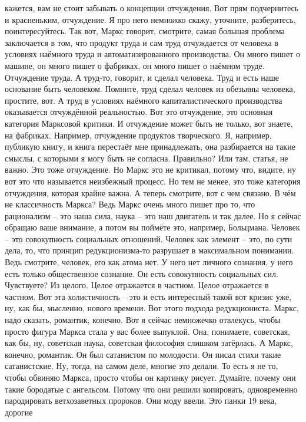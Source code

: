 кажется, вам не стоит забывать о концепции отчуждения. Вот прям подчернитесь и
красненьким, отчуждение. Я про него немножко скажу, уточните, разберитесь,
поинтересуйтесь. Так вот, Маркс говорит, смотрите, самая большая проблема
заключается в том, что продукт труда и сам труд отчуждается от человека в
условиях наёмного труда и автоматизированного производства. Он много пишет о
машине, он много пишет о фабриках, он много пишет о наёмном труде. Отчуждение
труда. А труд-то, говорит, и сделал человека. Труд и есть наше основание быть
человеком. Помните, труд сделал человек из обезьяны человека, простите, вот. А
труд в условиях наёмного капиталистического производства оказывается отчуждённой
реальностью. Вот это отчуждение, это основная категория Марксовой критики. И
отчуждение может быть не только, вот знаете, на фабриках. Например, отчуждение
продуктов творческого. Я, например, публикую книгу, и книга перестаёт мне
принадлежать, она разбирается на такие смыслы, с которыми я могу быть не
согласна. Правильно? Или там, статья, не важно. Это тоже отчуждение. Но Маркс
это не критикал, потому что, видите, ну вот это что называется неизбежный
процесс. Но тем не менее, это тоже категория отчуждения, которая крайне важна. А
теперь смотрите, вот с чем связано. В чём не классичность Маркса? Ведь Маркс
очень много пишет про то, что рационализм – это наша сила, наука – это наш
двигатель и так далее. Но я сейчас обращаю ваше внимание, а потом вы поймёте
это, например, Больцмана. Человек – это совокупность социальных отношений.
Человек как элемент – это, по сути дела, то, что принцип редукционизма-то
разрушает в максимальном понимании. Ведь смотрите, человек, его как атома нет. У
него нет личного сознания, у него есть только общественное сознание. Он есть
совокупность социальных сил. Чувствуете? Из целого. Целое отражается в частном.
Целое отражается в частном. Вот эта холистичность – это и есть интересный такой
вот кризис уже, ну, как бы, мысленно, нового времени. Вот этого подхода
редукциониста. Маркс, надо сказать, романтик, конечно. Вот я сейчас немножечко
отвлекусь, чтобы просто фигура Маркса стала у вас более выпуклой. Она,
понимаете, советская, как бы, ну, советская наука, советская философия слишком
затёрлась. А Маркс, конечно, романтик. Он был сатанистом по молодости. Он писал
стихи такие сатанистские. Ну, тогда, на самом деле, многие это делали. То есть я
не то, чтобы обвиняю Маркса, просто чтобы он картинку рисует. Думайте, почему
они такие бородатые с ангельсом. Потому что они решили копировать, одновременно
пародировать ветхозаветных пророков. Они моду ввели. Это панки 19 века, дорогие

